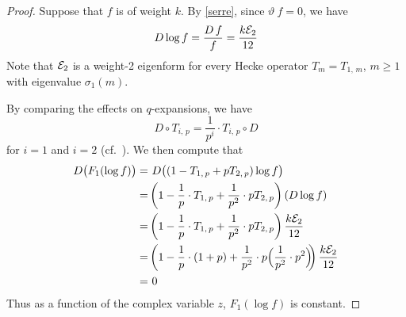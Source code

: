 \documentclass{gtpart}
\theoremstyle{definition}
\theoremstyle{remark}
\newcommand{\CE}{{\cal E}}
\newcommand{\si}{\sigma}
\renewcommand{\=}{\approx}
\renewcommand{\-}{\sim}
\numberwithin{equation}{section}
\numberwithin{thm}{section}
\begin{document}
\begin{proof}
 Suppose that $f$ is of weight $k$.  By \eqref{serre}, since 
 $\vartheta ~\! f = 0$, we have 
 \[
  D \log f = \frac{D ~\! f}{f} = \frac{k \CE_2}{12} 
 \]
 Note that $\CE_2$ is a weight-2 eigenform for every Hecke operator 
 $T_m = T_{1,\,m}$, $m \geq 1$ with eigenvalue $\si_1(m)$.  

 By comparing the effects on $q$-expansions, we have 
 \begin{equation}
  \label{DT}
  D \circ T_{i,\,p} = \frac{1}{p^i} \cdot T_{i,\,p} \circ D 
 \end{equation}
 for $i = 1$ and $i = 2$ (cf.~\cite[Remarque after Th\'eor\`em 5]{fmpadiq}).  
 We then compute that 
 \begin{equation*}
  \begin{split}
   D \big( F_1(\log f) \big) = & ~ D \big( (1 - T_{1,\,p} + p T_{2,\,p}) 
                                 \log f \big) \\
                             = & \left( 1 - \frac{1}{p} \cdot T_{1,\,p} + 
                                 \frac{1}{p^2} \cdot p T_{2,\,p} \right) 
                                 (D \log f) \\
                             = & \left( 1 - \frac{1}{p} \cdot T_{1,\,p} + 
                                 \frac{1}{p^2} \cdot p T_{2,\,p} \right) 
                                 \frac{k \CE_2}{12} \\
                             = & \left( 1 - \frac{1}{p} \cdot (1 + p) + 
                                 \frac{1}{p^2} \cdot p \Big( \frac{1}{p^2} \cdot 
                                 p^2 \Big) \!\! \right) \frac{k \CE_2}{12} \\
                             = & ~ 0 
  \end{split}
 \end{equation*}
 Thus as a function of the complex variable $z$, $F_1(\log f)$ is constant.  
\end{proof}
\end{document}
